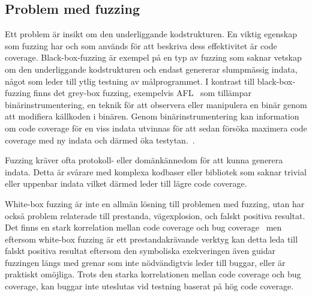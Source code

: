 \subsection{Problem med fuzzing} Ett problem är insikt om den underliggande
kodstrukturen. En viktig egenskap som fuzzing har och som används för att beskriva dess
effektivitet är code coverage. Black-box-fuzzing är exempel på en typ av fuzzing som
saknar vetskap om den underliggande kodstrukturen och endast genererar
slumpmässig indata, något som leder till ytlig testning av målprogrammet. I
kontrast till black-box-fuzzing finns det grey-box fuzzing, exempelvis
AFL~\cite{aflplusplus} som tillämpar binärinstrumentering, en
teknik för att observera eller manipulera en binär genom att modifiera källkoden
i binären. Genom binärinstrumentering kan information om code coverage
för en viss indata utvinnas för att sedan försöka maximera code coverage med ny indata
och därmed öka testytan.~\cite{challenges_fuzzing}.


Fuzzing kräver ofta protokoll- eller domänkännedom för att kunna generera
indata. Detta är svårare med komplexa kodbaser eller bibliotek som saknar
trivial eller uppenbar indata vilket därmed leder till lägre code coverage.

White-box fuzzing är inte en allmän lösning till problemen med fuzzing, utan
har också problem relaterade till prestanda, vägexplosion, och falskt positiva
resultat. Det finns en stark korrelation mellan code coverage och bug
coverage~\cite{directed_greybox_fuzzing} men eftersom white-box fuzzing är ett
prestandakrävande verktyg kan detta leda till falskt positiva resultat eftersom den
symboliska exekveringen även guidar fuzzingen längs med grenar som
inte nödvändigtvis leder till buggar, eller är praktiskt omöjliga.
Trots den starka korrelationen mellan code coverage och bug coverage, kan buggar inte uteslutas vid
testning baserat på hög code coverage.


